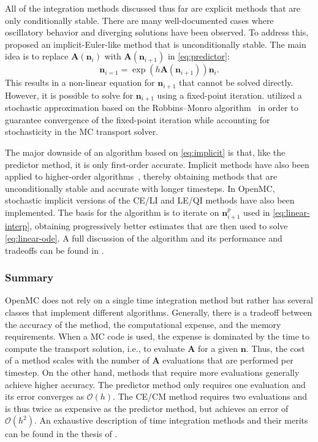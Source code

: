 \documentclass[3p,authoryear]{elsarticle}
\newcommand{\vect}[1]{\mathbf{#1}} %
\begin{document}
All of the integration methods discussed thus far are explicit methods that are
only conditionally stable. There are many well-documented cases where
oscillatory behavior and diverging solutions have been observed. To address
this, \citet{dufek2013ane} proposed an implicit-Euler-like method that is
unconditionally stable. The main idea is to replace $\vect{A}(\vect{n}_i)$ with
$\vect{A}(\vect{n}_{i+1})$ in \cref{eq:predictor}:
\begin{equation}
  \label{eq:implicit}
  \vect{n}_{i=1} = \exp \left( h\vect{A}(\vect{n}_{i+1}) \right) \vect{n}_i.
\end{equation}
This results in a non-linear equation for $\vect{n}_{i+1}$ that cannot be solved
directly. However, it is possible to solve for $\vect{n}_{i+1}$ using a
fixed-point iteration. \citet{dufek2013ane} utilized a stochastic approximation
based on the Robbins--Monro algorithm~\citep{robbins1951ams} in order to
guarantee convergence of the fixed-point iteration while accounting for
stochasticity in the MC transport solver.

The major downside of an algorithm based on \cref{eq:implicit} is that, like the
predictor method, it is only first-order accurate. Implicit methods have also
been applied to higher-order
algorithms~\citep{kotlyar2014ane,kotlyar2016ane,cosgrove2020ane}, thereby
obtaining methods that are unconditionally stable and accurate with longer
timesteps. In OpenMC, stochastic implicit versions of the CE/LI and LE/QI
methods have also been implemented. The basis for the algorithm is to iterate on
$\vect{n}_{i+1}^p$ used in \cref{eq:linear-interp}, obtaining progressively
better estimates that are then used to solve \cref{eq:linear-ode}. A full
discussion of the algorithm and its performance and tradeoffs can be found in
\citep{josey2017phd}.

\subsubsection{Summary}

OpenMC does not rely on a single time integration method but rather has several
classes that implement different algorithms. Generally, there is a tradeoff
between the accuracy of the method, the computational expense, and the memory
requirements. When a MC code is used, the expense is dominated by the time
to compute the transport solution, i.e., to evaluate $\vect{A}$ for a given
$\vect{n}$. Thus, the cost of a method scales with the number of $\vect{A}$
evaluations that are performed per timestep. On the other hand, methods that
require more evaluations generally achieve higher accuracy. The predictor method
only requires one evaluation and its error converges as $\mathcal{O}(h)$. The
CE/CM method requires two evaluations and is thus twice as expensive as the
predictor method, but achieves an error of $\mathcal{O}(h^2)$. An exhaustive
description of time integration methods and their merits can be found in the
thesis of \citet{josey2017phd}.
\end{document}
